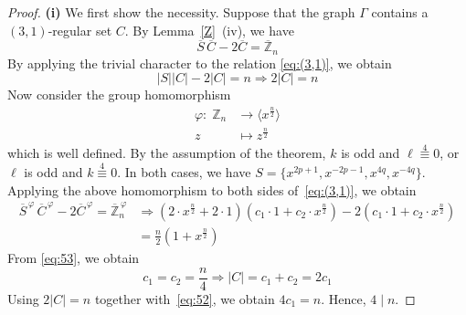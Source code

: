 \documentclass[12pt]{article}
\begin{document}
 \begin{proof}
 \textbf{(i)} We first show the necessity. Suppose that the graph $\Gamma$ contains a $(3,1)$-regular set $C$. By Lemma~\ref{Z}~(iv), we have
\begin{equation}\label{eq:(3,1)}
	\overline{S}\,\overline{C}-2\overline{C}
	=\overline{\mathbb{Z}}_{n}
\end{equation}
 By applying the trivial character to the relation \eqref{eq:(3,1)}, we obtain
 \[
 |S||C|-2|C|=n \Longrightarrow  2|C|=n
 \]
 Now consider the group homomorphism
 	\[
 \begin{aligned}
 	\varphi :\; \mathbb{Z}_n &\to \langle x^{\frac{n}{2}} \rangle \\
 	z &\mapsto z^{\frac{n}{2}}
 \end{aligned}
 \]
 which is well defined. By the assumption of the theorem, $k$ is odd and $\ell\stackrel{4}{\equiv}0$, or $\ell$ is odd and $k\stackrel{4}{\equiv}0$. In both cases, we have $S=\{x^{2p+1},x^{-2p-1},x^{4q},x^{-4q}\}$.  Applying the above homomorphism to both sides of~\eqref{eq:(3,1)}, we obtain
 \begin{equation}\label{eq:53}
 	\begin{aligned}
 		\overline{S}^{\,\varphi}\,\overline{C}^{\,\varphi}-2\overline{C}^{\,\varphi} =
 		\overline{\mathbb{Z}}_{n}^{\,\varphi}
 		&\Longrightarrow
 		\left(2\cdot x^{\frac{n}{2}}+2\cdot 1 \right)\left(c_1\cdot 1+c_2\cdot x^{\frac{n}{2}}\right)-
 		2\left(c_1\cdot 1+c_2\cdot x^{\frac{n}{2}}\right) \\
 		&=
 		\frac{n}{2}\left(1+x^{\frac{n}{2}}\right)
 	\end{aligned}
 \end{equation}
 From \eqref{eq:53}, we obtain
 \begin{equation}\label{eq:52}
 	c_1=c_2=\frac{n}{4}
 	\Longrightarrow
 	|C|=c_1+c_2=2c_1
 \end{equation}
 Using \(2|C|=n\) together with~\eqref{eq:52}, we obtain
 $
 4c_1=n.
 $
 Hence, \(4\mid n\).


\end{proof}
\end{document}
